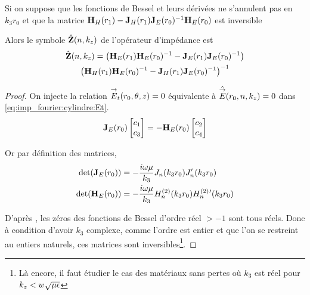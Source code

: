     \begin{thm}
      Si on suppose que les fonctions de Bessel et leurs dérivées ne s’annulent pas en \(k_3r_0\) et que
      la matrice \(\mathbf{H}_{H}(r_1) - \mathbf{J}_{H}(r_1)\mathbf{J}_{E}(r_0)^{-1}\mathbf{H}_{E}(r_0)\) est inversible

      Alors le symbole \(\hat {\mathbf{Z}}(n,k_z)\) de l'opérateur d'impédance est
      \begin{multline}
        \hat {\mathbf{Z}}(n,k_z) =
        \left(\mathbf{H}_{E}(r_1)\mathbf{H}_{E}(r_0)^{-1} - \mathbf{J}_{E}(r_1)\mathbf{J}_{E}(r_0)^{-1}\right)\\
        \left(\mathbf{H}_{H}(r_1)\mathbf{H}_{E}(r_0)^{-1} - \mathbf{J}_{H}(r_1)\mathbf{J}_{E}(r_0)^{-1}\right)^{-1}
      \end{multline}
    \end{thm}

    \begin{proof}

      On injecte la relation \({\overset{\rightarrow}{E}}_t(r_0,\theta,z) = 0\) équivalente à \(\hat {{\overset{\rightarrow}{E}}}(r_0,n,k_z) = 0\) dans \eqref{eq:imp_fourier:cylindre:Et}.
      \begin{equation}
        \mathbf{J}_{E}(r_0)
        \begin{bmatrix}
          c_1 \\
          c_3
        \end{bmatrix}
        =-\mathbf{H}_{E}(r_0)
        \begin{bmatrix}
          c_2 \\
          c_4
        \end{bmatrix}
      \end{equation}

      Or par définition des matrices,
      \begin{align}
        \det(\mathbf{J}_E(r_0)) &= -\dfrac{i\omega\mu}{k_3}J_n(k_3r_0)J_n'(k_3r_0)
        \\
        \det(\mathbf{H}_E(r_0)) &= -\dfrac{i\omega\mu}{k_3}H_n^{(2)}(k_3r_0)H_n^{(2)}{}'(k_3r_0)
      \end{align}

      D’après \cite[p.~370]{abramowitz_handbook_1964}, les zéros des fonctions de Bessel d'ordre réel \(>-1\) sont tous réels.
      Donc à condition d'avoir \(k_3\) complexe, comme l'ordre est entier et que l'on se restreint au entiers naturels, ces matrices sont inversibles\footnote{Là encore, il faut étudier le cas des matériaux sans pertes où \(k_3\) est réel pour \(k_z < w\sqrt{\mu\epsilon}\)}.


\end{proof}
